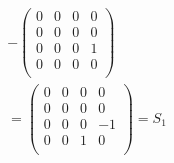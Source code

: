 \documentclass[11pt]{article}
\begin{document}
\begin{gather*}
    -
    \begin{pmatrix}
    0 & 0 & 0 & 0 \\
    0 & 0 & 0 & 0 \\
    0 & 0 & 0 & 1\\
    0 & 0 & 0 & 0 \\
    \end{pmatrix} \\
    =
    \begin{pmatrix}
    0 & 0 & 0 & 0 \\
    0 & 0 & 0 & 0 \\
    0 & 0 & 0 & -1\\
    0 & 0 & 1 & 0 \\
    \end{pmatrix} = S_{1}
\end{gather*}
\end{document}
